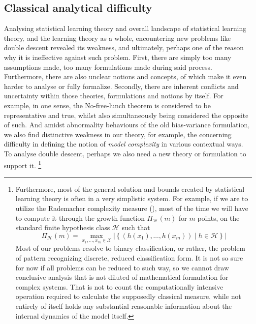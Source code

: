 \documentclass[10pt,oneside,oldfontcommands,dvipsnames,article]{memoir}
\begin{document}
\subsection{Classical analytical difficulty}

Analysing statistical learning theory and overall landscape of statistical learning theory, and the learning theory as a whole, encountering new problems like double descent revealed its weakness, and ultimately, perhaps one of the reason why it is ineffective against such problem. First, there are simply too many assumptions made, too many formulations made during said process. Furthermore, there are also unclear notions and concepts, of which make it even harder to analyse or fully formalize. Secondly, there are inherent conflicts and uncertainty within those theories, formulations and notions by itself. For example, in one sense, the No-free-lunch theorem is considered to be representative and true, whilst also simultaneously being considered the opposite of such. And amidst abnormality behaviours of the old bias-variance formulation, we also find distinctive weakness in our theory, for example, the concerning difficulty in defining the notion of \textit{model complexity} in various contextual ways. To analyse double descent, perhaps we also need a new theory or formulation to support it. \footnote{Furthermore, most of the general solution and bounds created by statistical learning theory is often in a very simplistic system. For example, if we are to utilize the Rademacher complexity measure (\cite{10.5555/2371238}), most of the time we will have to compute it through the growth function $\Pi_{\mathcal{H}}(m)$ for $m$ points, on the standard finite hypothesis class $\mathcal{H}$ such that 
\begin{equation}
    \Pi_{\mathcal{H}}(m) = \max_{x_1, \dots, x_m \in \mathcal{X}} \left| \left\{ (h(x_1), \dots, h(x_m)) \mid h \in \mathcal{H} \right\} \right|
\end{equation}
Most of our problems resolve to binary classification, or rather, the problem of pattern recognizing discrete, reduced classification form. It is not so sure for now if all problems can be reduced to such way, so we cannot draw conclusive analysis that is not diluted of mathematical formulation for complex systems. That is not to count the computationally intensive operation required to calculate the supposedly classical measure, while not entirely of itself holds any substantial reasonable information about the internal dynamics of the model itself. }
\end{document}
